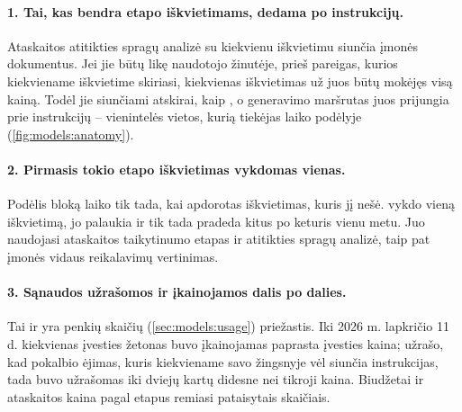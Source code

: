 \paragraph{1. Tai, kas bendra etapo iškvietimams, dedama po instrukcijų.} Ataskaitos atitikties
spragų analizė su kiekvienu iškvietimu siunčia įmonės dokumentus. Jei jie būtų likę naudotojo
žinutėje, prieš pareigas, kurios kiekviename iškvietime skiriasi, kiekvienas iškvietimas už
juos būtų mokėjęs visą kainą. Todėl jie siunčiami atskirai, kaip , o generavimo
maršrutas juos prijungia prie instrukcijų -- vienintelės vietos, kurią tiekėjas laiko
podėlyje (\cref{fig:models:anatomy}).

\paragraph{2. Pirmasis tokio etapo iškvietimas vykdomas vienas.} Podėlis bloką laiko tik tada,
kai apdorotas iškvietimas, kuris jį nešė.  vykdo vieną iškvietimą, jo
palaukia ir tik tada pradeda kitus po keturis vienu metu. Juo naudojasi ataskaitos
taikytinumo etapas ir atitikties spragų analizė, taip pat įmonės vidaus reikalavimų vertinimas.

\paragraph{3. Sąnaudos užrašomos ir įkainojamos dalis po dalies.} Tai ir yra
penkių skaičių (\cref{sec:models:usage}) priežastis. Iki 2026 m. lapkričio 11 d. kiekvienas
įvesties žetonas buvo įkainojamas paprasta įvesties kaina; 
užrašo, kad pokalbio ėjimas, kuris kiekviename savo žingsnyje vėl siunčia instrukcijas, tada
buvo užrašomas iki dviejų kartų didesne nei tikroji kaina. Biudžetai ir ataskaitos kaina pagal
etapus remiasi pataisytais skaičiais.

